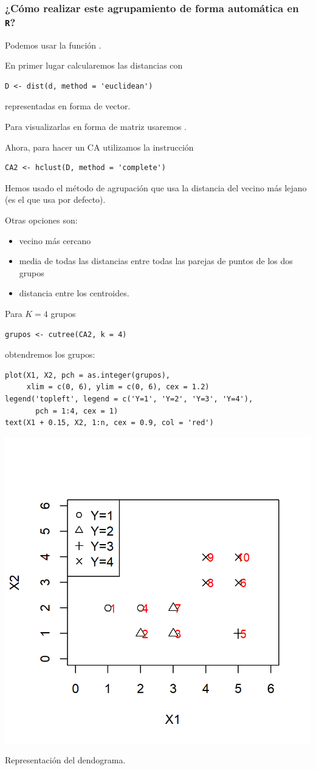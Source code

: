 \subsubsection{¿Cómo realizar este agrupamiento de forma automática en \textbf{\texttt{R}}?}
Podemos usar la función .

En primer lugar calcularemos las distancias con
\begin{lstlisting}
D <- dist(d, method = 'euclidean')
\end{lstlisting}
representadas en forma de vector.

Para visualizarlas en forma de matriz usaremos .

Ahora, para hacer un CA utilizamos la instrucción
\begin{lstlisting}
CA2 <- hclust(D, method = 'complete')
\end{lstlisting}
Hemos usado el método de agrupación  que usa la distancia del vecino más lejano (es el que usa  por defecto).

Otras opciones son:

\begin{itemize}
\item {} vecino más cercano
\item {} media de todas las distancias entre todas las parejas de puntos de los dos grupos
\item {} distancia entre los centroides.
\end{itemize}
Para $K=4$ grupos 
\begin{lstlisting}
grupos <- cutree(CA2, k = 4)
\end{lstlisting}
obtendremos los grupos:
\begin{lstlisting}
plot(X1, X2, pch = as.integer(grupos), 
     xlim = c(0, 6), ylim = c(0, 6), cex = 1.2)
legend('topleft', legend = c('Y=1', 'Y=2', 'Y=3', 'Y=4'),
       pch = 1:4, cex = 1)
text(X1 + 0.15, X2, 1:n, cex = 0.9, col = 'red')
\end{lstlisting}
\begin{center}
\includegraphics[width=0.5\linewidth]{"Temas/Imágenes/Tema 6/screenshot009"}
\end{center}
Representación del dendograma.


